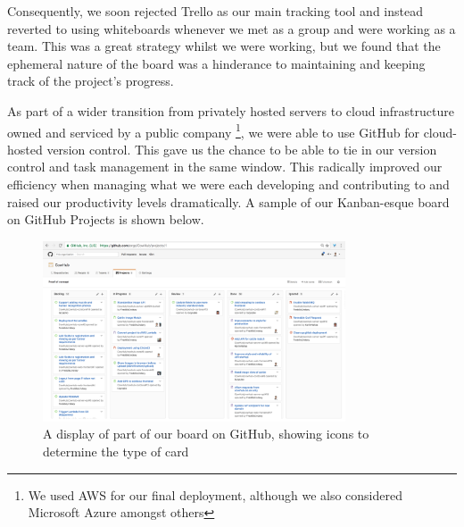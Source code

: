 Consequently, we soon rejected Trello as our main tracking tool and instead reverted to using whiteboards whenever we met as a group and were working as a team. This was a great strategy whilst we were working, but we found that the ephemeral nature of the board was a hinderance to maintaining and keeping track of the project's progress.

As part of a wider transition from privately hosted servers to cloud infrastructure owned and serviced by a public company \footnote{We used AWS for our final deployment, although we also considered Microsoft Azure amongst others}, we were able to use GitHub for cloud-hosted version control. This gave us the chance to be able to tie in our version control and task management in the same window. This radically improved our efficiency when managing what we were each developing and contributing to and raised our productivity levels dramatically. A sample of our Kanban-esque board on GitHub Projects is shown below.

\begin{figure}[H]
	\centering
	\includegraphics[width=0.8\textwidth]{images/github-project}
	\caption[CowHub's 'Kanban' board on GitHub using GitHub Projects]{
		A display of part of our board on GitHub, showing icons to determine the type of card
	}
\end{figure}







